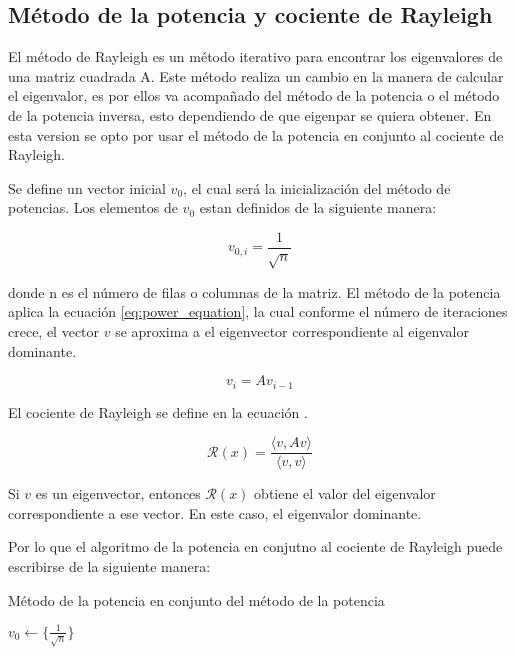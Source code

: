 \subsection{Método de la potencia y cociente de Rayleigh}

El método de Rayleigh es un método iterativo para encontrar los eigenvalores de  una matriz cuadrada A. Este método realiza un cambio en la manera de calcular el eigenvalor, es por ellos va acompañado del método de la potencia o el método de la potencia inversa, esto dependiendo de que eigenpar se quiera obtener. En esta version se opto por usar el método de la potencia en conjunto al cociente de Rayleigh.

Se define un vector inicial $v_0$, el cual será la inicialización del método de potencias. Los elementos de  $v_0$ estan definidos de la siguiente manera:

\begin{equation}
    v_{0,i}= \frac{1}{\sqrt{n}}
\end{equation}

donde n es el número de filas o columnas de la matriz. El método de la potencia aplica la ecuación \ref{eq:power_equation}, la cual conforme el número de iteraciones crece, el vector $v$ se aproxima a el eigenvector correspondiente al eigenvalor dominante.

\begin{equation}
    v_{i} = Av_{i-1} \label{eq:power_equation}
\end{equation}

El cociente de Rayleigh se define en la ecuación .

\begin{equation}
    \mathcal{R}(x) = \frac{\langle v, Av\rangle}{\langle v,v\rangle}
\end{equation}

Si $v$ es un eigenvector, entonces $\mathcal{R}(x)$ obtiene el valor del eigenvalor correspondiente a ese vector. En este caso, el eigenvalor dominante.

Por lo que el algoritmo de la potencia en conjutno al cociente de Rayleigh puede escribirse de la siguiente manera:

\begin{algorithm}[H]
    \caption{Método de la potencia en conjunto del método de la potencia}
    \label{alg:Rayleigh_method}
    $v_0 \gets \{\frac{1}{\sqrt{n}}\}$\\
\end{algorithm}